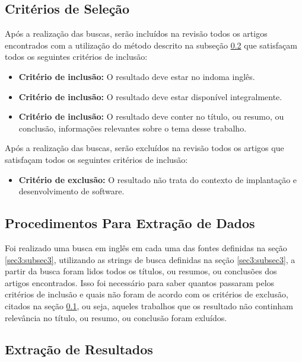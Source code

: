 \documentclass[12pt]{article}
\begin{document}
\subsection{Critérios de Seleção} \label{sec3:subsec4}

Após a realização das buscas, serão incluídos na revisão todos os artigos encontrados com a utilização do método descrito na subseção \ref{sec3:subsec5} que satisfaçam todos os seguintes critérios de inclusão:

 \begin{itemize}
   \item  \textbf{Critério de inclusão:} O resultado deve estar no indoma inglês.
   \item  \textbf{Critério de inclusão:}  O resultado deve estar disponível integralmente.    
   \item  \textbf{Critério de inclusão:}   O resultado deve conter no título, ou resumo, ou conclusão,  informações relevantes sobre o tema desse trabalho.
 \end{itemize}
 
 Após a realização das buscas, serão excluídos na revisão todos os artigos que satisfaçam todos os seguintes critérios de inclusão:

 \begin{itemize}
   \item  \textbf{Critério de exclusão:} O resultado não trata do contexto de implantação e desenvolvimento de software.
 \end{itemize}
 
\subsection{Procedimentos Para Extração de Dados} \label{sec3:subsec5}

Foi realizado uma busca em inglês em cada uma das fontes definidas na seção \ref{sec3:subsec3}, utilizando as strings de busca definidas na seção \ref{sec3:subsec3}, a partir da busca foram lidos todos os títulos, ou resumos, ou conclusões dos artigos encontrados. Isso foi necessário para saber quantos passaram pelos critérios de inclusão e quais não foram de acordo com os critérios de exclusão, citados na seção \ref{sec3:subsec4}, ou seja, aqueles trabalhos que os resultado não continham relevância no título, ou resumo, ou conclusão foram exluídos.

\subsection{Extração de Resultados} \label{sec3:subsec6}
\end{document}
